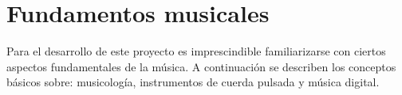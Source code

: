 \section{Fundamentos musicales}
\label{c:teoria_musical}

Para el desarrollo de este proyecto es imprescindible familiarizarse con ciertos aspectos fundamentales de la música. A continuación se describen los conceptos básicos sobre: musicología, instrumentos de cuerda pulsada y música digital.



